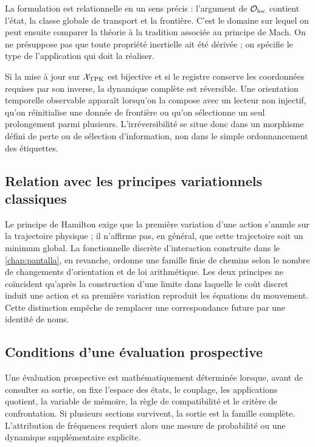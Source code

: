 La formulation est relationnelle en un sens précis : l'argument de
\(\mathcal O_{\rm loc}\) contient l'état, la classe globale de transport et
la frontière. C'est le domaine sur lequel on peut ensuite comparer
la théorie à la tradition associée au principe de Mach. On ne présuppose pas que
toute propriété inertielle ait été dérivée ; on spécifie le type de l'application qui
doit la réaliser.

Si la mise à jour sur \(\mathcal X_{\rm TPK}\) est bijective et si le registre
conserve les coordonnées requises par son inverse, la dynamique complète est
réversible. Une orientation temporelle observable apparaît lorsqu'on la compose avec un
lecteur non injectif, qu'on réinitialise une donnée de frontière ou qu'on sélectionne un seul
prolongement parmi plusieurs. L'irréversibilité se situe donc dans un
morphisme défini de perte ou de sélection d'information, non dans le simple
ordonnancement des étiquettes.

\subsection{Relation avec les principes variationnels classiques}

Le principe de Hamilton exige que la première variation d'une action s'annule
sur la trajectoire physique ; il n'affirme pas, en général, que cette trajectoire soit un
minimum global. La fonctionnelle discrète d'interaction construite dans le
\cref{chap:pantalla}, en revanche, ordonne une famille finie de chemins selon le
nombre de changements d'orientation et de loi arithmétique. Les deux principes
ne coïncident qu'après la construction d'une limite dans laquelle le coût discret
induit une action et sa première variation reproduit les équations du
mouvement. Cette distinction empêche de remplacer une correspondance future par
une identité de noms.

\subsection{Conditions d'une évaluation prospective}

Une évaluation prospective est mathématiquement déterminée lorsque, avant de
consulter sa sortie, on fixe l'espace des états, le couplage, les
applications quotient, la variable de mémoire, la règle de compatibilité et le
critère de confrontation. Si plusieurs sections survivent, la sortie est la famille
complète. L'attribution de fréquences requiert alors une mesure de
probabilité ou une dynamique supplémentaire explicite.


